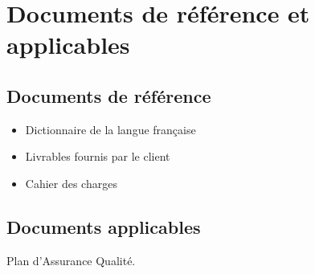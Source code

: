 
\section{Documents de référence et applicables}
    
    \subsection{Documents de référence}
\begin{itemize}
   \item Dictionnaire de la langue française
   \item Livrables fournis par le client
   \item Cahier des charges
\end{itemize}

    \subsection{Documents applicables}
        Plan d'Assurance Qualité.

